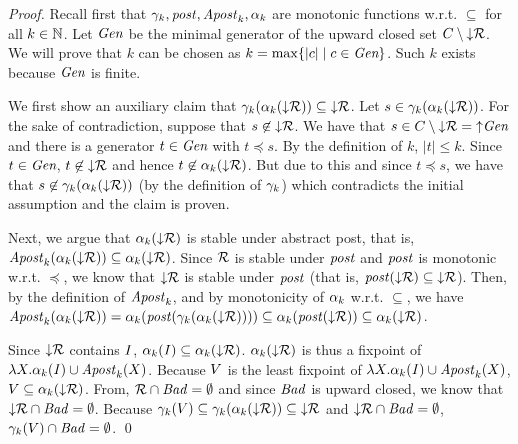 \begin{proof}
Recall first that $\gamma_{k}, \mathit{post}, {\mathit{Apost}}_k, \alpha_{k}$ are monotonic functions w.r.t. $\subseteq$ for all $k\in\mathbb N$. 
%
Let $\emph{Gen}$ be the minimal generator of the upward closed set $C\setminus{\downarrow}\mathcal{R}$.
%
We will prove that $k$ can be chosen as $k=\max\{|c|\mid c\in\emph{Gen}\}$.
%
Such $k$ exists because $\emph{Gen}$ is finite.



We first show an auxiliary claim that $\gamma_{k}(\alpha_k({\downarrow}\mathcal{R})) \subseteq {\downarrow}\mathcal{R}$.
%
Let $s\in \gamma_{k}(\alpha_k({\downarrow}\mathcal{R}))$. 
%
For the sake of contradiction, suppose that $s\not\in {\downarrow}\mathcal{R}$.
%
%
%
%
We have that $s\in C\setminus{\downarrow}\mathcal{R}  ={\uparrow}\emph{Gen}$
%
and there is a generator $t\in\emph{Gen}$ with $t\preceq s$.
%
By the definition of $k$, $|t|\leq k$. 
%
Since $t\in\emph{Gen}$, $t\not\in{\downarrow}\mathcal{R}$ and hence $t\not\in\alpha_k({\downarrow}\mathcal{R})$. %
But due to this and since %
$t\preceq s$,
%
%
%
%
we have that $s\not\in\gamma_{k}(\alpha_k({\downarrow}\mathcal{R}))$ (by the definition of $\gamma_{k}$)
%
which contradicts the initial assumption and the claim is proven.

Next, we argue that ${\alpha_k({\downarrow}\mathcal{R})}$ is stable under abstract post, that is,
%
${\mathit{Apost}}_k({\alpha_k({\downarrow}\mathcal{R})}) \subseteq {\alpha_k({\downarrow}\mathcal{R})}$.
%
Since $\mathcal{R}$ is stable under $\mathit{post}$ and $\mathit{post}$ is monotonic w.r.t. $\preceq$,
%
we know that ${\downarrow}\mathcal{R}$ is stable under $\mathit{post}$ 
%
(that is, $\mathit{post}({\downarrow}\mathcal{R})\subseteq {\downarrow}\mathcal{R}$).
%
%
%
Then,  by the definition of ${\mathit{Apost}}_k$,
%
and by monotonicity of $\alpha_{k}$ w.r.t. $\subseteq$, 
%
we have
$\apostof {\thing} k = 
%
\abstr k {\post(\gammaof k (\thing))} \subseteq 
%
\abstr k {\post(\dcl\reach)}\subseteq 
%
%
\thing$. 
%

Since ${\downarrow}\mathcal{R}$ contains $\mathit{I}$, $\alpha_k(\mathit{I})  \subseteq \alpha_k({\downarrow}\mathcal{R})$.
%
$\alpha_k({\downarrow}\mathcal{R})$ is thus a fixpoint of $\lambda X.\alpha_k(\mathit{I})\cup{\mathit{Apost}}_k (X)$.
%
Because $V$ is the least fixpoint of $\lambda X.\alpha_k(\mathit{I})\cup{\mathit{Apost}}_k (X)$, 
%
$V\subseteq \alpha_k({\downarrow}\mathcal{R})$.
%
From, $\mathcal{R}\cap\mathit{Bad} = \emptyset$ and since $\mathit{Bad}$ is upward closed, 
we know that ${\downarrow}\mathcal{R}\cap\mathit{Bad} = \emptyset$.
%
Because $\gammaof k (\Vk)\subseteq 
%
\gammaof k (\thing) \subseteq  
%
%
\dcl\reach$
%
and ${\downarrow}\mathcal{R}\cap \mathit{Bad} = \emptyset$,
%
$\gamma_{k} (V)\cap\mathit{Bad}=\emptyset$.
\qed
\end{proof}

